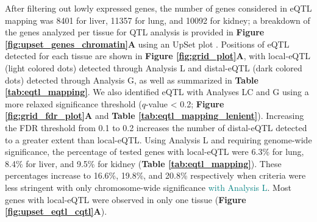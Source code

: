 \documentclass[9pt,twocolumn,twoside]{gsajnl}
\newcommand{\GKinline}[1]{\textcolor{teal}{#1}}
\begin{document}
After filtering out lowly expressed genes, the number of genes considered in eQTL mapping was 8401 for liver, 11357 for lung, and 10092 for kidney; a breakdown of the genes analyzed per tissue for QTL analysis is provided in \textbf{Figure \ref{fig:upset_genes_chromatin}A} using an UpSet plot \citep{Conway2017}. 
Positions of eQTL detected for each tissue are shown in \textbf{Figure \ref{fig:grid_plot}A}, with local-eQTL (light colored dots) detected through Analysis L and distal-eQTL (dark colored dots) detected through Analysis G, as well as summarized in \textbf{Table \ref{tab:eqtl_mapping}}. 
We also identified eQTL with Analyses LC and G using a more relaxed significance threshold ($q$-value < 0.2; \textbf{Figure \ref{fig:grid_fdr_plot}A} and \textbf{Table \ref{tab:eqtl_mapping_lenient}}). Increasing the FDR threshold from 0.1 to 0.2 increases the number of distal-eQTL detected to a greater extent than local-eQTL. Using Analysis L and requiring genome-wide significance, the percentage of tested genes with local-eQTL were 6.3\% for lung, 8.4\% for liver, and 9.5\% for kidney (\textbf{Table \ref{tab:eqtl_mapping}}). These percentages increase to 16.6\%, 19.8\%, and 20.8\% respectively when criteria were less stringent with only chromosome-wide significance \GKinline{with Analysis L}. Most genes with local-eQTL were observed in only one tissue (\textbf{Figure \ref{fig:upset_eqtl_cqtl}A}).
\end{document}
